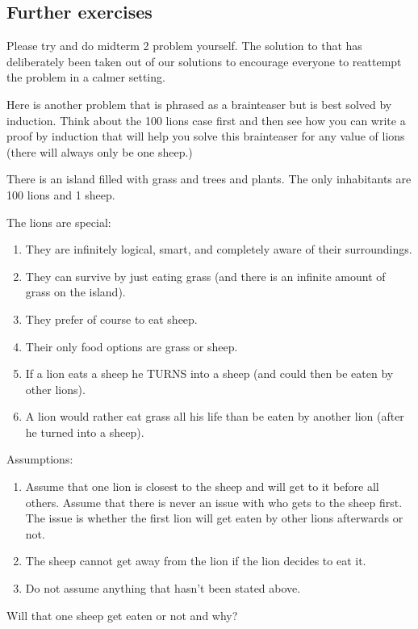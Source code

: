 \documentclass[12pt]{article}
\begin{document}
\pagebreak

\subsection*{Further exercises}

Please try and do midterm 2 problem yourself. The solution to that has deliberately been taken out of our solutions to encourage everyone to reattempt the problem in a calmer setting.

\vspace{1in}

Here is another problem that is phrased as a brainteaser but is best solved by induction. Think about the 100 lions case first and then see how you can write a proof by induction that will help you solve this brainteaser for any value of lions (there will always only be one sheep.)

There is an island filled with grass and trees and plants. The only inhabitants are 100 lions and 1 sheep. 

The lions are special: 

\begin{enumerate}
\item They are infinitely logical, smart, and completely aware of their surroundings.
\item They can survive by just eating grass (and there is an infinite amount of grass on the island).
\item They prefer of course to eat sheep.
\item Their only food options are grass or sheep.
\item If a lion eats a sheep he TURNS into a sheep (and could then be eaten by other lions).
\item A lion would rather eat grass all his life than be eaten by another lion (after he turned into a sheep).
\end{enumerate}


Assumptions:

\begin{enumerate}
\item Assume that one lion is closest to the sheep and will get to it before all others. Assume that there is never an issue with who gets to the sheep first. The issue is whether the first lion will get eaten by other lions afterwards or not.
\item The sheep cannot get away from the lion if the lion decides to eat it.
\item Do not assume anything that hasn't been stated above.
\end{enumerate}

Will that one sheep get eaten or not and why?
\end{document}
